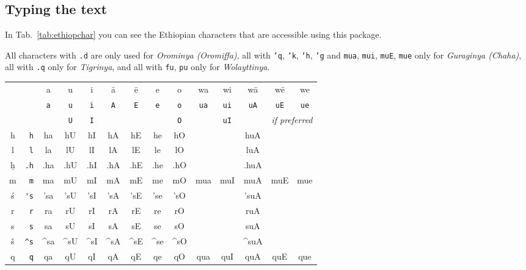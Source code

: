 \documentclass[a4paper]{article}
\begin{document}
\subsection{Typing the text}

In Tab.~\ref{tab:ethiopchar} you can see the Ethiopian
characters that are accessible using this package.

All characters with {\tt .d} are only used for {\it Orominya (Oromiffa)},
all with {\tt 'q}, {\tt 'k}, {\tt 'h}, {\tt 'g} and
{\tt mua}, {\tt mui}, {\tt muE}, {\tt mue} only for
{\it Guraginya (Chaha)}, all with {\tt .q} only for {\it Tigrinya},
and all with {\tt fu}, {\tt pu} only for {\it Wolayttinya}.

\begin{table}[p]
  \begin{center}
    \def\sci|#1|{\selectlanguage{english}%
      \mdseries #1%
      \selectlanguage{ethiop}}
    \begin{tabular}{|c|r|ccccccc|ccccc|}
      \cline{3-14}
      \multicolumn{2}{r|}{}&
        \sci|a|&\sci|u|&\sci|i|&\sci|\=a|&\sci|\=e|&\sci|e|&\sci|o|&
        \sci|wa|&\sci|wi|&\sci|w\=a|&\sci|w\=e|&\sci|we|\\
      \cline{3-14}
      \multicolumn{2}{r|}{}&
        \verb|a|&\verb|u|&\verb|i|&\verb|A|&\verb|E|&\verb|e|&\verb|o|&
        \verb|ua|&\verb|ui|&\verb|uA|&\verb|uE|&\verb|ue|\\
      \multicolumn{2}{r|}{}&
        &\verb|U|&\verb|I|&&&&\verb|O|&&\verb|uI|&
        \multicolumn{3}{r|}{\textrm{\small\itshape\mdseries if preferred}}\\
      \hline
      \sci|h|   &\verb| h|& ha&hU&hI&hA&hE&he&hO&&&huA&&\\
      \sci|l|   &\verb| l|& la&lU&lI&lA&lE&le&lO&&&luA&&\\
      \sci|\d h|&\verb|.h|& .ha&.hU&.hI&.hA&.hE&.he&.hO&&&.huA&&\\
      \sci|m|   &\verb| m|& ma&mU&mI&mA&mE&me&mO&mua&muI&muA&muE&mue\\
      \sci|\'s| &\verb|'s|& 'sa&'sU&'sI&'sA&'sE&'se&'sO&&&'suA&&\\
      \sci|r|   &\verb| r|& ra&rU&rI&rA&rE&re&rO&&&ruA&&\\
      \sci|s|   &\verb| s|& sa&sU&sI&sA&sE&se&sO&&&suA&&\\
      \sci|\v s|&\verb|^s|& ^sa&^sU&^sI&^sA&^sE&^se&^sO&&&^suA&&\\
      \sci|q|   &\verb| q|& qa&qU&qI&qA&qE&qe&qO&qua&quI&quA&quE&que\\

\end{tabular}
\end{center}
\end{table}
\end{document}
